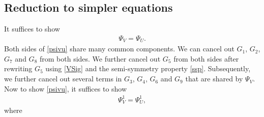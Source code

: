 \documentclass{amsart}
\theoremstyle{definition}
\theoremstyle{remark}
\numberwithin{equation}{section}
\begin{document}
\subsection{Reduction to simpler equations}
It suffices to show
\begin{align}
\Psi_V=\Psi_U. \label{psivu}
\end{align}
Both sides of \eqref{psivu} share many common components.
We can cancel out $G_1$, $G_2$, $G_7$ and $G_8$ from both sides. We further cancel out $G_5$ from both sides after rewriting $G_5$ using \eqref{VSig} and the semi-symmetry property \eqref{ssp}.
Subsequently, we further cancel out several terms in
$G_3$, $G_4$, $G_6$ and $G_9$ that are shared by $\Psi_V$.
Now to show \eqref{psivu}, it suffices to show
\begin{align}
\Psi_V^1=\Psi_U^1, \label{pvu1}
\end{align}
where
\end{document}
